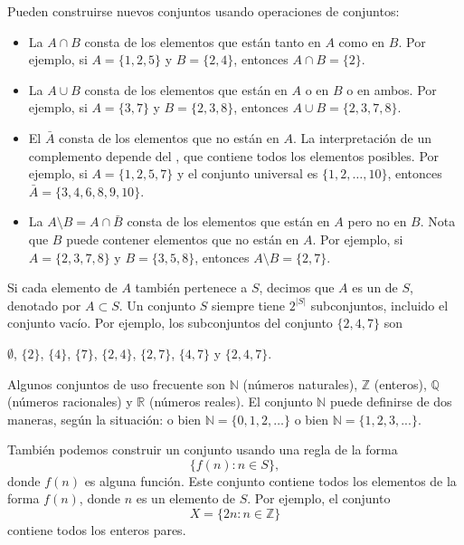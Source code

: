 \begin{samepage}
Pueden construirse nuevos conjuntos usando operaciones de conjuntos:
\begin{itemize}
\item La  $A \cap B$ consta de los elementos
que están tanto en $A$ como en $B$.
Por ejemplo, si $A=\{1,2,5\}$ y $B=\{2,4\}$,
entonces $A \cap B = \{2\}$.
\item La  $A \cup B$ consta de los elementos
que están en $A$ o en $B$ o en ambos.
Por ejemplo, si $A=\{3,7\}$ y $B=\{2,3,8\}$,
entonces $A \cup B = \{2,3,7,8\}$.
\item El  $\bar A$ consta de los elementos
que no están en $A$.
La interpretación de un complemento depende del
, que contiene todos los elementos posibles.
Por ejemplo, si $A=\{1,2,5,7\}$ y el conjunto universal es
$\{1,2,\ldots,10\}$, entonces $\bar A = \{3,4,6,8,9,10\}$.
\item La  $A \setminus B = A \cap \bar B$
consta de los elementos que están en $A$ pero no en $B$.
Nota que $B$ puede contener elementos que no están en $A$.
Por ejemplo, si $A=\{2,3,7,8\}$ y $B=\{3,5,8\}$,
entonces $A \setminus B = \{2,7\}$.
\end{itemize}
\end{samepage}

Si cada elemento de $A$ también pertenece a $S$,
decimos que $A$ es un  de $S$,
denotado por $A \subset S$.
Un conjunto $S$ siempre tiene $2^{|S|}$ subconjuntos,
incluido el conjunto vacío.
Por ejemplo, los subconjuntos del conjunto $\{2,4,7\}$ son
\begin{center}
$\emptyset$,
$\{2\}$, $\{4\}$, $\{7\}$, $\{2,4\}$, $\{2,7\}$, $\{4,7\}$ y $\{2,4,7\}$.
\end{center}

Algunos conjuntos de uso frecuente son
$\mathbb{N}$ (números naturales),
$\mathbb{Z}$ (enteros),
$\mathbb{Q}$ (números racionales) y
$\mathbb{R}$ (números reales).
El conjunto $\mathbb{N}$
puede definirse de dos maneras, según
la situación:
o bien $\mathbb{N}=\{0,1,2,\ldots\}$
o bien $\mathbb{N}=\{1,2,3,...\}$.

También podemos construir un conjunto usando una regla de la forma
\[\{f(n) : n \in S\},\]
donde $f(n)$ es alguna función.
Este conjunto contiene todos los elementos de la forma $f(n)$,
donde $n$ es un elemento de $S$.
Por ejemplo, el conjunto
\[X=\{2n : n \in \mathbb{Z}\}\]
contiene todos los enteros pares.

